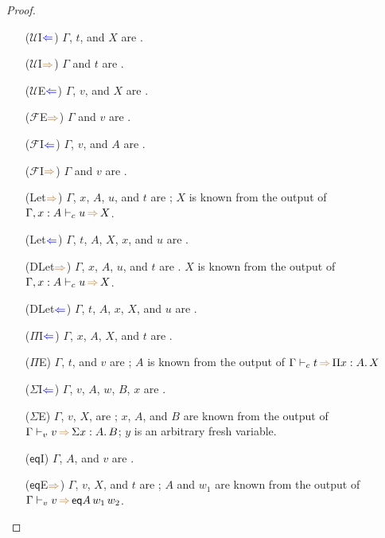 \documentclass[a4,natbib=false]{article}
\newcommand{\ctov}{\mathcal{U}}
\newcommand{\vtoc}{\mathcal{F}}
\newcommand{\sigmatype}[2]{\Sigma {#1}.\,#2}
\newcommand{\pitype}[2]{\Pi {#1}.\,#2}
\newcommand{\eqtype}[3]{\mathsf{eq}{#1}\,{#2}\,{#3}}
\newcommand{\checks}{{\color{blue} \Leftarrow}}
\newcommand{\infers}{{\color{brown} \Rightarrow}}
\newcommand{\judgecInfer}[3]{{#1} \vdash_{c} {#2} \, \infers \, {#3}}
\newcommand{\judgevInfer}[3]{{#1} \vdash_{v} {#2} \, \infers \, {#3}}
\begin{document}
\begin{proof}
\begin{multicols}{2}
\begin{itemize}
      \item[($\ctov$I$\checks$)]
        $\Gamma$, $t$, and $X$ are \fromconcl.

      \item[($\ctov$I$\infers$)]
        $\Gamma$ and $t$ are \fromconcl.

      \item[($\ctov$E$\checks$)]
        $\Gamma$, $v$, and $X$ are \fromconcl.

      \item[($\vtoc$E$\infers$)]
        $\Gamma$ and $v$ are \fromconcl.

      \item[($\vtoc$I$\checks$)]
        $\Gamma$, $v$, and $A$ are \fromconcl.

      \item[($\vtoc$I$\infers$)]
        $\Gamma$ and $v$ are \fromconcl.

      \item[(Let$\infers$)]
        $\Gamma$, $x$, $A$, $u$, and $t$ are \fromconcl;
        $X$ is known from the output of $\judgecInfer{\Gamma, x : A}{u}{X}$.
        
      \item[(Let$\checks$)]
        $\Gamma$, $t$, $A$, $X$, $x$, and $u$ are \fromconcl.

      \item[(DLet$\infers$)]
        $\Gamma$, $x$, $A$, $u$, and $t$ are \fromconcl.
        $X$ is known from the output of $\judgecInfer{\Gamma, x:A}{u}{X}$.

      \item[(DLet$\checks$)]
        $\Gamma$, $t$, $A$, $x$, $X$, and $u$ are \fromconcl.

      \item[($\Pi$I$\checks$)]
        $\Gamma$, $x$, $A$, $X$, and $t$ are \fromconcl.

      \item[($\Pi$E)]
        $\Gamma$, $t$, and $v$ are \fromconcl;
        $A$ is known from the output of $\judgecInfer{\Gamma}{t}{\pitype{x:A}{X}}$

      \item[($\Sigma$I$\checks$)]
        $\Gamma$, $v$, $A$, $w$, $B$, $x$ are \fromconcl.

      \item[($\Sigma$E)]
        $\Gamma$, $v$, $X$, are \fromconcl;
        $x$, $A$, and $B$ are known from the output of $\judgevInfer{\Gamma}{v}{\sigmatype{x:A}{B}}$;
        $y$ is an arbitrary fresh variable.
        
      \item[($\mathsf{eq}$I)]
        $\Gamma$, $A$, and $v$ are \fromconcl.

      \item[($\mathsf{eq}$E$\infers$)]
        $\Gamma$, $v$, $X$, and $t$ are \fromconcl;
        $A$ and $w_1$ are known from the output of $\judgevInfer{\Gamma}{v}{\eqtype{A}{w_1}{w_2}}$.
  \end{itemize}
  \end{multicols}


\end{proof}
\end{document}
